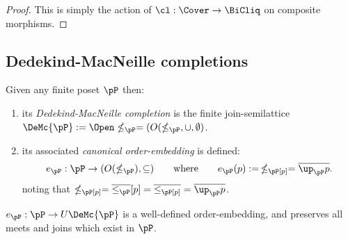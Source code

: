 \documentclass{article}
\begin{document}
\begin{proof}
This is simply the action of $\cl : \Cover \to \BiCliq$ on composite morphisms.
\end{proof}


\subsection{Dedekind-MacNeille completions}

\begin{definition}
\label{def:dedekind_macneille_completion}
\item
Given any finite poset $\pP$ then:
\begin{enumerate}
\item
its \emph{Dedekind-MacNeille completion} is the finite join-semilattice $\DeMc{\pP} := \Open\nleq_\pP = (O(\nleq_\pP,\cup,\emptyset)$. 
\item
its associated \emph{canonical order-embedding} is defined:
\[
e_\pP : \pP \to (O(\nleq_\pP),\subseteq)
\qquad\text{where}\qquad 
e_\pP(p) := \, \nleq_\pP[p] = \overline{\up_\pP p}.
\]
noting that $\nleq_\pP[p] = \overline{\leq_\pP}[p] = \overline{\leq_\pP[p]} = \overline{\up_\pP p}$.
\endbox
\end{enumerate}
\end{definition}

\smallskip

\begin{theorem}[[Dedekind-MacNeille embedding for finite posets]
\label{thm:dedekind_macneille_construction}
\item
$e_\pP : \pP \to U\DeMc{\pP}$ is a well-defined order-embedding, and preserves all meets and joins which exist in $\pP$.
\end{theorem}
\end{document}
